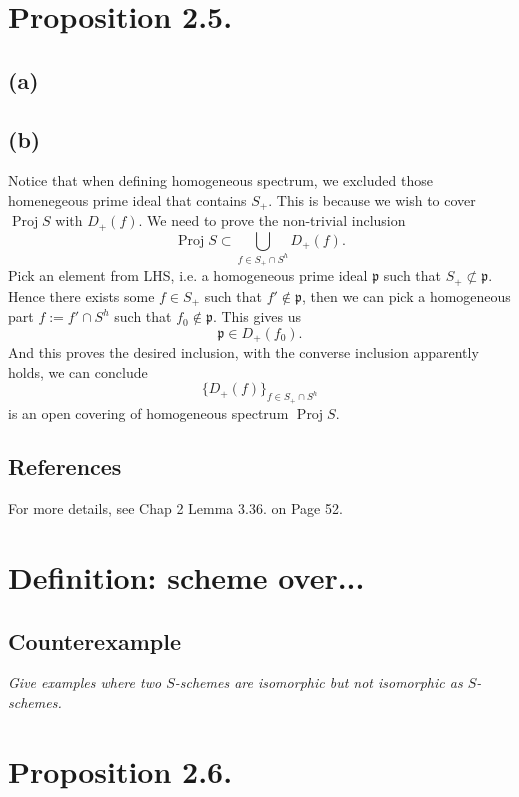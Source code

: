 \section{Proposition 2.5.}

\subsection{(a)}

\subsection{(b)}

Notice that when defining homogeneous spectrum, we excluded those homenegeous prime ideal that contains $S_+$. This is because we wish to cover $\operatorname{Proj}S$ with $D_+(f)$. We need to prove the non-trivial inclusion 
\[\operatorname{Proj}S\subset \bigcup_{f\in S_+\cap S^h}D_+(f).\]
Pick an element from LHS, i.e. a homogeneous prime ideal $\mathfrak p$ such that $S_+\not\subset \mathfrak p$. Hence there exists some $f\in S_+$ such that $f'\notin \mathfrak p$, then we can pick a homogeneous part $f:=f'\cap S^h$ such that $f_0\notin \mathfrak p$. This gives us 
\[\mathfrak p\in D_+(f_0).\]
And this proves the desired inclusion, with the converse inclusion apparently holds, we can conclude 
\[\{D_+(f)\}_{f\in S_+\cap S^h}\] is an open covering of homogeneous spectrum $\operatorname{Proj}S$.

\subsection{References}

For more details, see \cite{qing2006algebraic} Chap 2 Lemma 3.36. on Page 52.

\section{Definition: scheme over...}

\subsection{Counterexample}
\textit{Give examples where two $S$-schemes are isomorphic but not isomorphic as $S$-schemes.}


\section{Proposition 2.6.}

